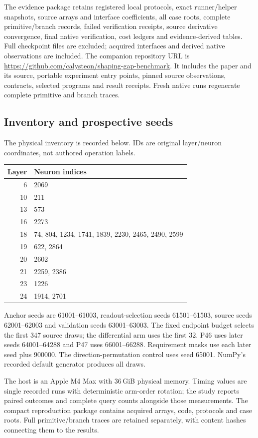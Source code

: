 \documentclass[11pt]{article}
\begin{document}
The evidence package retains registered local protocols, exact runner/helper
snapshots, source arrays and interface coefficients, all case roots, complete
primitive/branch records, failed verification receipts, source derivative
convergence, final native verification, cost ledgers and evidence-derived
tables. Full checkpoint files are excluded; acquired interfaces and derived native
observations are included.
The companion repository URL is
\url{https://github.com/calysteon/shaping-gap-benchmark}. It includes the paper
and its source, portable experiment entry points, pinned source observations,
contracts, selected programs and result receipts. Fresh native runs regenerate
complete primitive and branch traces.

\subsection{Inventory and prospective seeds}
The physical inventory is recorded below. IDs are original layer/neuron
coordinates, not authored operation labels.
\begin{center}
\small
\begin{tabular}{rl}
\toprule
Layer & Neuron indices\\
\midrule
6 & 2069\\
10 & 211\\
13 & 573\\
16 & 2273\\
18 & 74, 804, 1234, 1741, 1839, 2230, 2465, 2490, 2599\\
19 & 622, 2864\\
20 & 2602\\
21 & 2259, 2386\\
23 & 1226\\
24 & 1914, 2701\\
\bottomrule
\end{tabular}
\end{center}
Anchor seeds are 61001--61003, readout-selection seeds 61501--61503,
source seeds 62001--62003 and validation seeds 63001--63003. The fixed
endpoint budget selects the first 347 source draws; the differential arm uses
the first 32. P46 uses later seeds 64001--64288 and P47 uses 66001--66288.
Requirement masks use each later seed plus 900000. The direction-permutation
control uses seed 65001. NumPy's recorded default generator produces all draws.

The host is an Apple M4 Max with 36\,GiB physical memory. Timing values are
single recorded runs with deterministic arm-order rotation; the study reports
paired outcomes and complete query counts alongside those measurements.
The compact reproduction package contains acquired arrays, code, protocols
and case roots. Full primitive/branch traces are retained separately, with
content hashes connecting them to the results.
\end{document}
